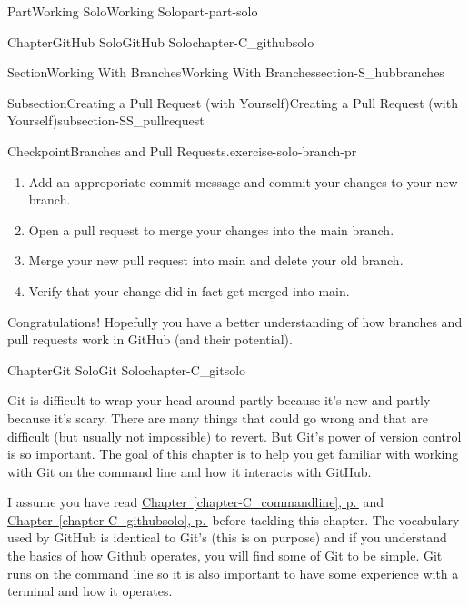 \documentclass[twoside,10pt,]{book}
\newcommand{\xreffont}{\relax}
\begin{document}
\begin{partptx}{Part}{Working Solo}{}{Working Solo}{}{}{part-part-solo}
\begin{chapterptx}{Chapter}{GitHub Solo}{}{GitHub Solo}{}{}{chapter-C_githubsolo}
\begin{sectionptx}{Section}{Working With Branches}{}{Working With Branches}{}{}{section-S_hubbranches}
\begin{subsectionptx}{Subsection}{Creating a Pull Request (with Yourself)}{}{Creating a Pull Request (with Yourself)}{}{}{subsection-SS_pullrequest}
\begin{inlineexercise}{Checkpoint}{Branches and Pull Requests.}{exercise-solo-branch-pr}
\begin{enumerate}[font=\bfseries,label=(\alph*),ref=\alph*]
\item{}Add an approporiate commit message and commit your changes to your new branch.%
\item{}Open a pull request to merge your changes into the main branch.%
\item{}Merge your new pull request into main and delete your old branch.%
\item{}Verify that your change did in fact get merged into main.%
\end{enumerate}%
\end{inlineexercise}%
\end{subsectionptx}
\begin{conclusion}{}%
Congratulations! Hopefully you have a better understanding of how branches and pull requests work in GitHub (and their potential).%
\end{conclusion}%
\end{sectionptx}
\end{chapterptx}
%
\typeout{************************************************}
\typeout{************************************************}
%
\begin{chapterptx}{Chapter}{Git Solo}{}{Git Solo}{}{}{chapter-C_gitsolo}
\renewcommand*{\chaptername}{Chapter}
%
%
\begin{introduction}{}%
Git is difficult to wrap your head around partly because it's new and partly because it's scary. There are many things that could go wrong and that are difficult (but usually not impossible) to revert. But Git's power of version control is so important. The goal of this chapter is to help you get familiar with working with Git on the command line and how it interacts with GitHub.%
\par
I assume you have read \hyperref[chapter-C_commandline]{Chapter~{\xreffont\ref{chapter-C_commandline}}, p.\,\pageref{chapter-C_commandline}} and \hyperref[chapter-C_githubsolo]{Chapter~{\xreffont\ref{chapter-C_githubsolo}}, p.\,\pageref{chapter-C_githubsolo}} before tackling this chapter. The vocabulary used by GitHub is identical to Git's (this is on purpose) and if you understand the basics of how Github operates, you will find some of Git to be simple. Git runs on the command line so it is also important to have some experience with a terminal and how it operates.%
\par

\end{introduction}
\end{chapterptx}
\end{partptx}
\end{document}
